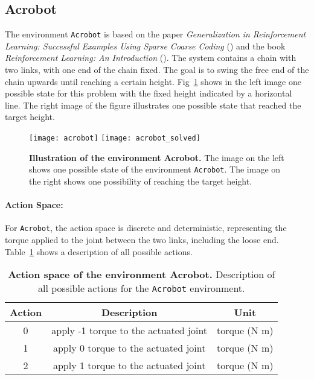\subsection{Acrobot}
The environment \verb|Acrobot| is based on the paper \emph{Generalization in Reinforcement Learning: Successful Examples Using Sparse Coarse Coding} (\cite{NIPS1995_8f1d4362}) and the book \emph{Reinforcement Learning: An Introduction} (\cite{montague1999reinforcement}). The system contains a chain with two links, with one end of the chain fixed. The goal is to swing the free end of the chain upwards until reaching a certain height. Fig~\ref{fig:acrobot} shows in the left image one possible state for this problem with the fixed height indicated by a horizontal line. The right image of the figure illustrates one possible state that reached the target height.
\begin{figure}[!ht]
  \centering
\texttt{[image: acrobot]} \hspace*{10mm} \texttt{[image: acrobot\_solved]}
\caption[Illustration of the environment Acrobot]{
  \textbf{Illustration of the environment Acrobot.}
  The image on the left shows one possible state of the environment \texttt{Acrobot}. The image on the right shows one possibility of reaching the target height.
}
\label{fig:acrobot}
\end{figure}

\paragraph*{Action Space:} For \verb|Acrobot|, the action space is discrete and deterministic, representing the torque applied to the joint between the two links, including the loose end. Table~\ref{table:acrobot_act} shows a description of all possible actions.
\begin{table}[!ht]
  \centering
  \begin{tabular}{ |c|c|c| }
    \hline
    Action & Description & Unit \\
    \hline
    0 & apply -1 torque to the actuated joint & torque (N m) \\
    1 & apply 0 torque to the actuated joint & torque (N m) \\
    2 & apply 1 torque to the actuated joint & torque (N m) \\
    \hline
  \end{tabular}
  \caption[Action space of the environment Acrobot]{
    \textbf{Action space of the environment Acrobot.}
    Description of all possible actions for the \texttt{Acrobot} environment.
  }
  \label{table:acrobot_act}
\end{table}

